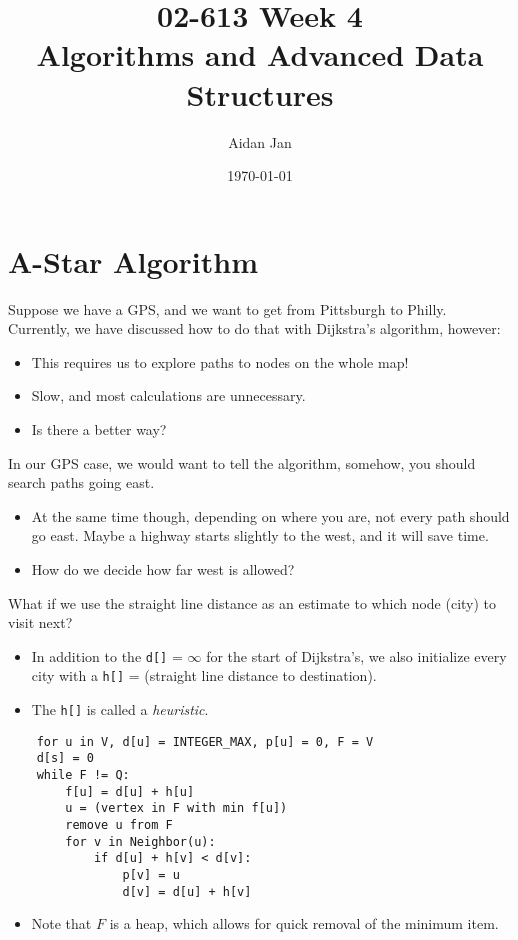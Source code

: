 \documentclass[10pt]{article}
\title{02-613 Week 4 \\ \large{Algorithms and Advanced Data Structures}}
\author{Aidan Jan}
\date{\today}
\begin{document}
\maketitle

\section*{A-Star Algorithm}
Suppose we have a GPS, and we want to get from Pittsburgh to Philly.  Currently, we have discussed how to do that with Dijkstra's algorithm, however:
\begin{itemize}
	\item This requires us to explore paths to nodes on the whole map!
	\item Slow, and most calculations are unnecessary.
	\item Is there a better way?
\end{itemize}
In our GPS case, we would want to tell the algorithm, somehow, you should search paths going east.
\begin{itemize}
	\item At the same time though, depending on where you are, not every path should go east.  Maybe a highway starts slightly to the west, and it will save time.
	\item How do we decide how far west is allowed?
\end{itemize}
What if we use the straight line distance as an estimate to which node (city) to visit next?
\begin{itemize}
	\item In addition to the \texttt{d[]} = $\infty$ for the start of Dijkstra's, we also initialize every city with a \texttt{h[]} = (straight line distance to destination).
	\item The \texttt{h[]} is called a \textit{heuristic}.
\end{itemize}
\begin{verbatim}
    for u in V, d[u] = INTEGER_MAX, p[u] = 0, F = V
    d[s] = 0
    while F != Q:
        f[u] = d[u] + h[u]
        u = (vertex in F with min f[u])
        remove u from F
        for v in Neighbor(u):
            if d[u] + h[v] < d[v]:
                p[v] = u
                d[v] = d[u] + h[v]
\end{verbatim}
\begin{itemize}
	\item Note that $F$ is a heap, which allows for quick removal of the minimum item.
\end{itemize}
\end{document}
